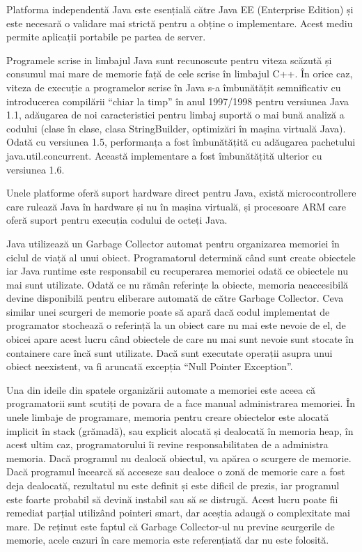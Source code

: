 \documentclass[12pt]{book}
\begin{document}
Platforma independentă Java este esențială către Java EE (Enterprise Edition) și este necesară o validare mai strictă  pentru a obține o implementare. Acest mediu permite aplicații portabile pe partea de server.

Programele scrise in limbajul Java sunt recunoscute pentru viteza scăzută și consumul mai mare de memorie față de cele scrise în limbajul C++. În orice caz, viteza de execuție a programelor scrise în Java s-a îmbunătățit semnificativ cu introducerea compilării “chiar la timp” în anul 1997/1998 pentru versiunea Java 1.1, adăugarea de noi caracteristici pentru limbaj suportă o mai bună analiză a codului (clase în clase, clasa StringBuilder, optimizări în mașina virtuală Java). Odată cu versiunea 1.5, performanța a fost îmbunătățită cu adăugarea pachetului java.util.concurrent. Această implementare a fost îmbunătățită ulterior cu versiunea 1.6.

Unele platforme oferă suport hardware direct pentru Java, există microcontrollere care rulează Java în hardware și nu în mașina virtuală, și procesoare ARM care oferă suport pentru execuția codului de octeți Java. \cite{thinkJava}

Java utilizează un Garbage Collector automat pentru organizarea memoriei în ciclul de viață al unui obiect. Programatorul determină când sunt create obiectele iar Java runtime este responsabil cu recuperarea memoriei odată ce obiectele nu mai sunt utilizate. Odată ce nu rămân referințe la obiecte, memoria neaccesibilă devine disponibilă pentru eliberare automată de către Garbage Collector. Ceva similar unei scurgeri de memorie poate să apară dacă codul implementat de programator stochează o referință la un obiect care nu mai este nevoie de el, de obicei apare acest lucru când obiectele de care nu mai sunt nevoie sunt stocate în containere care încă sunt utilizate. Dacă sunt executate operații asupra unui obiect neexistent, va fi aruncată excepția “Null Pointer Exception”. 

Una din ideile din spatele organizării automate a memoriei este aceea că programatorii sunt scutiți de povara de a face manual administrarea memoriei. În unele limbaje de programare, memoria pentru creare obiectelor este alocată implicit în stack (grămadă), sau explicit alocată și dealocată în memoria heap, în acest ultim caz, programatorului îi revine responsabilitatea de a administra memoria. Dacă programul nu dealocă obiectul, va apărea o scurgere de memorie. Dacă programul încearcă să acceseze sau dealoce o zonă de memorie care a fost deja dealocată, rezultatul nu este definit și este dificil de prezis, iar programul este foarte probabil să devină instabil sau să se distrugă. Acest lucru poate fii remediat parțial utilizând pointeri smart, dar aceștia adaugă o complexitate mai mare. De reținut este faptul că Garbage Collector-ul nu previne scurgerile de memorie, acele cazuri în care memoria este referențiată dar nu este folosită.
\end{document}

